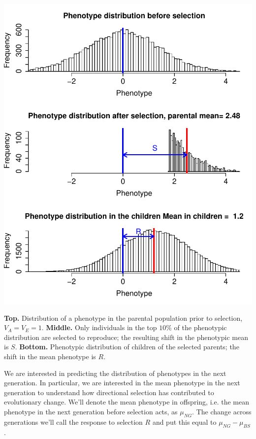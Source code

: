 \begin{marginfigure}
\begin{center}
\includegraphics[width=\textwidth]{figures/Response_to_sel/QT3.pdf}
\end{center}
\caption{{\bf Top.} Distribution of a phenotype in the parental population
  prior to selection, $V_A=V_E=1$. {\bf Middle.} Only individuals in the top $10\%$
  of the phenotypic distribution are selected to reproduce; the resulting shift
  in the phenotypic mean is $S$. {\bf Bottom.}  Phenotypic distribution of
  children of the selected parents; the shift in the mean phenotype is
$R$. }
\end{marginfigure}

We are interested in predicting the distribution of phenotypes in the next
generation. In particular, we are interested in the mean phenotype in
the next generation to understand how directional selection has
contributed to evolutionary change. We'll denote the mean phenotype in
offspring, i.e. the mean phenotype in the next generation before selection acts,
as $\mu_{NG}$. The change across generations we'll call the response
to selection $R$ and put this equal to $\mu_{NG}- \mu_{BS}$. \\


